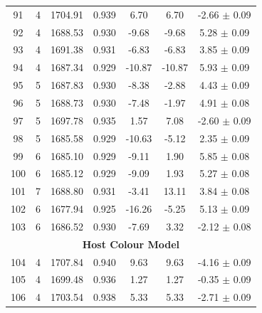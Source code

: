 \begin{longtable}{c c c c c c c}
    91 & 4 & 1704.91 & 0.939 & \cellcolor{aicorange}6.70 & \cellcolor{aiclightred}6.70 & \cellcolor{aicorange}-2.66 $\pm$ 0.09 \\
    92 & 4 & 1688.53 & 0.930 & \cellcolor{aiclightgreen}-9.68 & \cellcolor{aiclightgreen}-9.68 & \cellcolor{aicgreen}5.28 $\pm$ 0.09 \\
    93 & 4 & 1691.38 & 0.931 & \cellcolor{aicyellow}-6.83 & \cellcolor{aiclightgreen}-6.83 & \cellcolor{aiclightgreen}3.85 $\pm$ 0.09 \\
    94 & 4 & 1687.34 & 0.929 & \cellcolor{aicgreen}-10.87 & \cellcolor{aicgreen}-10.87 & \cellcolor{aicgreen}5.93 $\pm$ 0.09 \\
    95 & 5 & 1687.83 & 0.930 & \cellcolor{aiclightgreen}-8.38 & \cellcolor{aiclightyellow}-2.88 & \cellcolor{aiclightgreen}4.43 $\pm$ 0.09 \\
    96 & 5 & 1688.73 & 0.930 & \cellcolor{aiclightgreen}-7.48 & -1.97 & \cellcolor{aiclightgreen}4.91 $\pm$ 0.08 \\
    97 & 5 & 1697.78 & 0.935 & 1.57 & \cellcolor{aiclightred}7.08 & \cellcolor{aicorange}-2.60 $\pm$ 0.09 \\
    98 & 5 & 1685.58 & 0.929 & \cellcolor{aicgreen}-10.63 & \cellcolor{aicyellow}-5.12 & \cellcolor{aicyellow}2.35 $\pm$ 0.09 \\
    99 & 6 & 1685.10 & 0.929 & \cellcolor{aiclightgreen}-9.11 & 1.90 & \cellcolor{aicgreen}5.85 $\pm$ 0.08 \\
    100 & 6 & 1685.12 & 0.929 & \cellcolor{aiclightgreen}-9.09 & 1.93 & \cellcolor{aicgreen}5.27 $\pm$ 0.08 \\
    101 & 7 & 1688.80 & 0.931 & \cellcolor{aiclightyellow}-3.41 & \cellcolor{aicred}13.11 & \cellcolor{aiclightgreen}3.84 $\pm$ 0.08 \\
    102 & 6 & 1677.94 & 0.925 & \cellcolor{aicgreen}-16.26 & \cellcolor{aicyellow}-5.25 & \cellcolor{aicgreen}5.13 $\pm$ 0.09 \\
    103 & 6 & 1686.52 & 0.930 & \cellcolor{aiclightgreen}-7.69 & \cellcolor{aiclightorange}3.32 & \cellcolor{aicorange}-2.12 $\pm$ 0.08 \\
    \hline
    \multicolumn{7}{c}{\textbf{Host Colour Model}} \\
    \hline
    104 & 4 & 1707.84 & 0.940 & \cellcolor{aiclightred}9.63 & \cellcolor{aiclightred}9.63 & \cellcolor{aiclightred}-4.16 $\pm$ 0.09 \\
    105 & 4 & 1699.48 & 0.936 & 1.27 & 1.27 & -0.35 $\pm$ 0.09 \\
    106 & 4 & 1703.54 & 0.938 & \cellcolor{aicorange}5.33 & \cellcolor{aicorange}5.33 & \cellcolor{aicorange}-2.71 $\pm$ 0.09 \\

\end{longtable}

